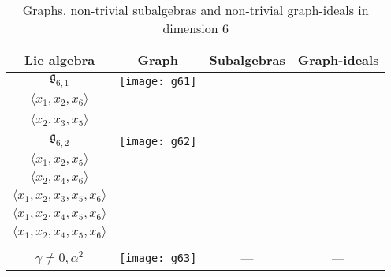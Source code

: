 \documentclass[12pt]{amsart}
\begin{document}
\begin{table}[h]
\caption{Graphs, non-trivial subalgebras and non-trivial graph-ideals in dimension 6}\label{dim6}
\begin{tabular}{|c|c|c|c|}
\hline
Lie algebra & Graph & Subalgebras & Graph-ideals \\ \hline
$\mathfrak{g}_{6,1}$ & \begin{minipage}{3cm}\texttt{[image: g61]}\end{minipage} &\begin{minipage}{2cm}$\langle x_1,x_3,x_4\rangle$\\$\langle x_1,x_2,x_6\rangle$\\$\langle x_2,x_3,x_5\rangle$\end{minipage} & ---
 \\ \hline
$\mathfrak{g}_{6,2}$ & \begin{minipage}{3cm}\vspace{0.1cm}\texttt{[image: g62]}\vspace{0.1cm}\end{minipage} & \begin{minipage}{3.2cm}\begin{center}$\langle x_1,x_2,x_6\rangle$\\$\langle x_1,x_2,x_5\rangle$\\$\langle x_2,x_4,x_6\rangle$\\$\langle x_1,x_2,x_3,x_5,x_6\rangle$\\$\langle x_1,x_2,x_4,x_5,x_6\rangle$\end{center}\end{minipage} &
\begin{minipage}{3.2cm}$\langle x_1,x_2,x_3,x_5,x_6\rangle$\\$\langle x_1,x_2,x_4,x_5,x_6\rangle$\end{minipage}\\ \hline 
\begin{minipage}{2cm}\begin{center}$\mathfrak{g}_{6,3}$\\{\footnotesize$\gamma\neq0,\alpha^2$}\end{center}\end{minipage} & \begin{minipage}{3.6cm}\vspace{0.1cm}\texttt{[image: g63]}\vspace{0.1cm}\end{minipage} & --- & --- \\\hline

\end{tabular}
\end{table}
\end{document}
